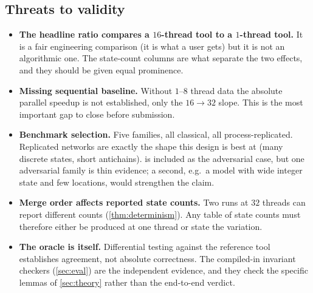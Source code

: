 \subsection{Threats to validity}

\begin{itemize}[leftmargin=1.2em, itemsep=3pt]
\item \textbf{The headline ratio compares a $16$-thread tool to a $1$-thread
      tool.}  It is a fair engineering comparison (it is what a user gets) but
      it is not an algorithmic one.  The state-count columns are what separate
      the two effects, and they should be given equal prominence.

\item \textbf{Missing sequential baseline.}  Without $1$--$8$ thread data the
      absolute parallel speedup is not established, only the $16 \to 32$ slope.
      This is the most important gap to close before submission.

\item \textbf{Benchmark selection.}  Five families, all classical, all
      process-replicated.  Replicated networks are exactly the shape this design
      is best at (many discrete states, short antichains).   is
      included as the adversarial case, but one adversarial family is thin
      evidence; a second, e.g.\ a model with wide integer state and few
      locations, would strengthen the claim.

\item \textbf{Merge order affects reported state counts.}  Two runs at $32$
      threads can report different counts (\cref{thm:determinism}).  Any table
      of state counts must therefore either be produced at one thread or state
      the variation.

\item \textbf{The oracle is  itself.}  Differential testing
      against the reference tool establishes agreement, not absolute
      correctness.  The compiled-in invariant checkers (\cref{sec:eval}) are
      the independent evidence, and they check the specific lemmas of
      \cref{sec:theory} rather than the end-to-end verdict.
\end{itemize}
